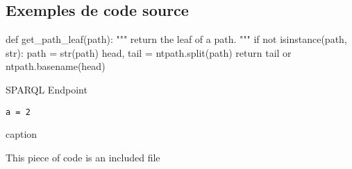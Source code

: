 \subsection{Exemples de code source}%
\label{sec:codessources}

\blindtext[1]
\begin{listing}[H]
\begin{pythoncode}
def get_path_leaf(path):
    """ return the leaf of a path. """
    if not isinstance(path, str):
        path = str(path)
    head, tail = ntpath.split(path)
    return tail or ntpath.basename(head)
\end{pythoncode}
\caption{SPARQL Endpoint}%
\label{lst:SPARQL Endpoint}
\end{listing}

\blindtext[2]


\begin{listing}[H]
\begin{verbatim}
a = 2
\end{verbatim}
\caption{caption}%
\label{lst:label}%
\end{listing}

\begin{listing}[H]
\caption{This piece of code is an included file}%
\label{lst:included-code}%
\end{listing}

